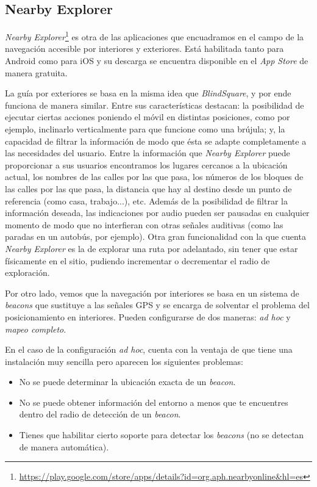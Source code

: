 
\subsection{Nearby Explorer}
\textit{Nearby Explorer}\footnote{\url{https://play.google.com/store/apps/details?id=org.aph.nearbyonline&hl=es}} es otra de las aplicaciones que encuadramos en el campo de la navegación accesible por interiores y exteriores. Está habilitada tanto para Android como para iOS y su descarga se encuentra disponible en el \textit{App Store} de manera gratuita. 

La guía por exteriores se basa en la misma idea que \textit{BlindSquare}, y por ende funciona de manera similar. Entre sus características destacan: la posibilidad de ejecutar ciertas acciones poniendo el móvil en distintas posiciones, como por ejemplo, inclinarlo verticalmente para que funcione como una brújula; y, la capacidad de filtrar la información de modo que ésta se adapte completamente a las necesidades del usuario. Entre la información que \textit{Nearby Explorer} puede proporcionar a sus usuarios encontramos los lugares cercanos a la ubicación actual, los nombres de las calles por las que pasa, los números de los bloques de las calles por las que pasa, la distancia que hay al destino desde un punto de referencia (como casa, trabajo...), etc. Además de la posibilidad de filtrar la información deseada, las indicaciones por audio pueden ser pausadas en cualquier momento de modo que no interfieran con otras señales auditivas (como las paradas en un autobús, por ejemplo). Otra gran funcionalidad con la que cuenta \textit{Nearby Explorer} es la de explorar una ruta por adelantado, sin tener que estar físicamente en el sitio, pudiendo incrementar o decrementar el radio de exploración.

Por otro lado, vemos que la navegación por interiores se basa en un sistema de \textit{beacons} que sustituye a las señales GPS y se encarga de solventar el problema del posicionamiento en interiores. Pueden configurarse de dos maneras: \textit{ad hoc} y \textit{mapeo completo}.

En el caso de la configuración \textit{ad hoc}, cuenta con la ventaja de que tiene una instalación muy sencilla pero aparecen los siguientes problemas:
\begin{itemize}
	\item No se puede determinar la ubicación exacta de un \textit{beacon}.
	\item No se puede obtener información del entorno a menos que te encuentres dentro del radio de detección de un \textit{beacon}.
	\item Tienes que habilitar cierto soporte para detectar los \textit{beacons} (no se detectan de manera automática).
\end{itemize}

